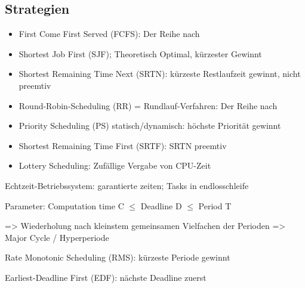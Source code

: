 \subsection*{Strategien}
\begin{itemize}
\item First Come First Served (FCFS): Der Reihe nach
\item Shortest Job First (SJF); Theoretisch Optimal, kürzester Gewinnt
\item Shortest Remaining Time Next (SRTN): kürzeste Restlaufzeit gewinnt, nicht preemtiv

\item Round-Robin-Scheduling (RR) = Rundlauf-Verfahren: Der Reihe nach
\item Priority Scheduling (PS) statisch/dynamisch: höchste Priorität gewinnt

\item Shortest Remaining Time First (SRTF): SRTN preemtiv
\item Lottery Scheduling: Zufällige Vergabe von CPU-Zeit

\end{itemize}

Echtzeit-Betriebssystem: garantierte zeiten; Tasks in endlosschleife

Parameter: Computation time C $\leq$ Deadline D $\leq$ Period T

=> Wiederholung nach kleinstem gemeinsamen Vielfachen der Perioden => Major Cycle / Hyperperiode


Rate Monotonic Scheduling (RMS): kürzeste Periode gewinnt

Earliest-Deadline First (EDF): nächste Deadline zuerst